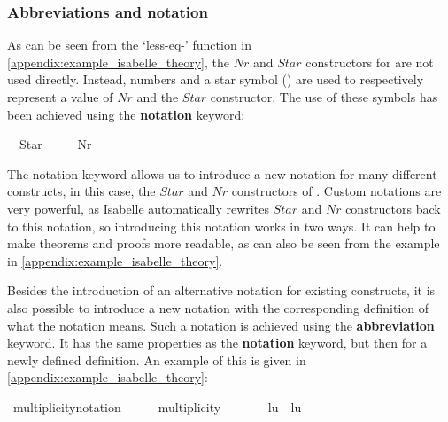 \subsubsection{Abbreviations and notation}
As can be seen from the `less-eq-\isasymM' function in \cref{appendix:example_isabelle_theory}, the $Nr$ and $Star$ constructors for \isasymM{} are not used directly. Instead, numbers and a star symbol (\isactrlemph) are used to respectively represent a value of $Nr$ and the $Star$ constructor. The use of these symbols has been achieved using the \textbf{notation} keyword:
\vspace{1em}\begin{isabellebody}
\isamarkupfalse%
\isanewline
\ \ Star\ {\isacharparenleft}{\isachardoublequoteopen}{\isacharparenleft}\isactrlemph {\isacharparenright}{\isachardoublequoteclose}\ {}{}{}{}{\isacharparenright}\ \isanewline
\ \ Nr\ {\isacharparenleft}{\isachardoublequoteopen}{\isacharparenleft}\isactrlbold {\isacharunderscore}{\isacharparenright}{\isachardoublequoteclose}\ {\isacharbrackleft}{}{}{}{}{\isacharbrackright}\ {}{}{}{}{\isacharparenright}
\end{isabellebody}

The notation keyword allows us to introduce a new notation for many different constructs, in this case, the $Star$ and $Nr$ constructors of \isasymM. Custom notations are very powerful, as Isabelle automatically rewrites $Star$ and $Nr$ constructors back to this notation, so introducing this notation works in two ways. It can help to make theorems and proofs more readable, as can also be seen from the example in \cref{appendix:example_isabelle_theory}.

Besides the introduction of an alternative notation for existing constructs, it is also possible to introduce a new notation with the corresponding definition of what the notation means. Such a notation is achieved using the \textbf{abbreviation} keyword. It has the same properties as the \textbf{notation} keyword, but then for a newly defined definition. An example of this is given in \cref{appendix:example_isabelle_theory}:
\vspace{1em}\begin{isabellebody}
\isamarkupfalse%
\ multiplicity{\isacharunderscore}notation\ {\isacharcolon}{\isacharcolon}\ {\isachardoublequoteopen}{\isasymM}\ {\isasymRightarrow}\ {\isasymM}\ {\isasymRightarrow}\ multiplicity{\isachardoublequoteclose}\ {\isacharparenleft}{\isachardoublequoteopen}{\isacharparenleft}{\isacharunderscore}{\isacharslash}{\isachardot}{\isachardot}{\isacharunderscore}{\isacharparenright}{\isachardoublequoteclose}\ {\isacharbrackleft}{}{}{\isacharcomma}\ {}{}{\isacharbrackright}\ {}{}{\isacharparenright}\ \isanewline
\ \ {\isachardoublequoteopen}l{\isachardot}{\isachardot}u\ {\isasymequiv}\ {\isacharparenleft}l{\isacharcomma}u{\isacharparenright}{\isachardoublequoteclose}
\end{isabellebody}

